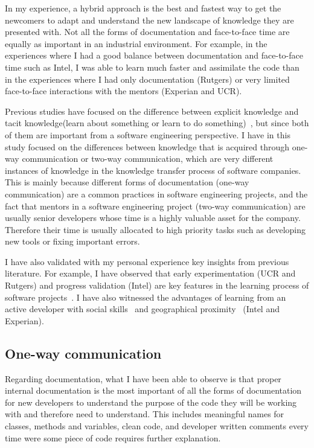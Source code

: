 \documentclass[12pt, letterpaper]{article}
\begin{document}
In my experience, a hybrid approach is the best and fastest way to get the newcomers to adapt and understand
the new landscape of knowledge they are presented with. Not all the forms of documentation and face-to-face time
are equally as important in an industrial environment. For example, in the experiences where I had a good balance between documentation and face-to-face time
such as Intel, I was able to learn much faster and assimilate the code than in the experiences where
I had only documentation (Rutgers) or very limited face-to-face interactions with the mentors (Experian and 
UCR). 

Previous studies have focused on the difference between explicit knowledge and tacit knowledge(learn about 
something or learn to do something)~\cite{cook99,civi00}, but since both of them are important from a software
engineering perspective. I have in this study focused on the differences between knowledge that is 
acquired through one-way communication or two-way communication, which are very different instances of knowledge
in the knowledge transfer process of software companies. This is mainly because different forms of 
documentation (one-way communication) are a common practices in software engineering projects, 
and the fact that mentors in a software engineering project (two-way communication) are usually senior developers 
whose time is a highly valuable asset for the company. Therefore their time is usually allocated to high priority tasks such as developing new tools or fixing important errors.

I have also validated with my personal experience key insights from previous literature. 
For example, I have observed that early experimentation (UCR and Rutgers) and progress validation (Intel) are key features
in the learning process of software projects~\cite{Dagenais10}. I have also witnessed the advantages of 
learning from an active developer with social skills~\cite{Steinmacher12}
and geographical proximity~\cite{Whitworth06} (Intel and Experian). 

\subsection{One-way communication}
Regarding documentation, what I have been able to observe is that proper internal documentation is the most 
important of all the forms of documentation for new developers to understand the purpose of the code they will
be working with and therefore need 
to understand. This includes meaningful names for classes, methods and variables, clean code, and developer written
comments every time were some piece of code requires further explanation.
\end{document}
